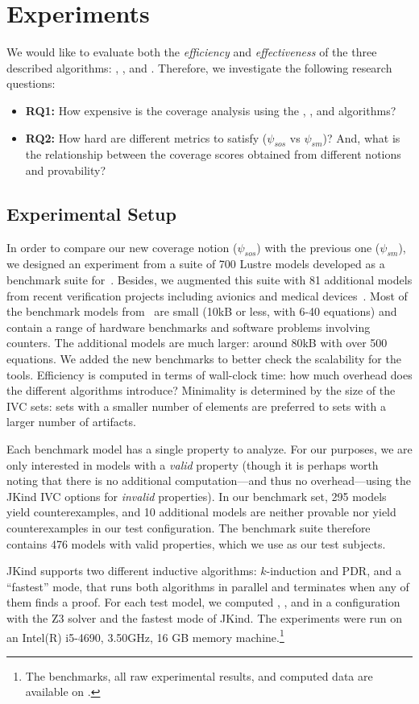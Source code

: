 \section{Experiments}
\label{sec:experiments}

We would like to evaluate both the {\em efficiency} and {\em
  effectiveness} of the three described algorithms: \ucbfalg, \ucalg, and \mustalg. Therefore, we investigate the following research questions:
\begin{itemize}
    \item \textbf{RQ1:} How expensive is the coverage analysis using the \ucalg, \mustalg, and \ucbfalg algorithms?
    \item \textbf{RQ2:} How hard are different metrics to satisfy ($\psi_{sos}$ vs $\psi_{sm}$)?  And, what is the relationship between the coverage scores obtained from different notions and provability?
\end{itemize}

\subsection{Experimental Setup}

In order to compare our new coverage notion ($\psi_{sos}$) with the previous one ($\psi_{sm}$), we designed an experiment from a suite of 700 Lustre models developed
as a benchmark suite for~\cite{Hagen08:FMCAD}. Besides, we augmented this suite
with 81 additional models from recent verification projects including
avionics and medical devices~\cite{QFCS15:backes,hilt2013}. Most of
the benchmark models from~\cite{Hagen08:FMCAD} are small (10kB or less,
with 6-40 equations) and contain a range of hardware benchmarks and
software problems involving counters. The additional models are much
larger: around 80kB with over 500 equations. We added the new
benchmarks to better check the scalability for the tools. Efficiency is computed in terms of wall-clock time: how
much overhead does the different algorithms introduce? Minimality is
determined by the size of the IVC sets: sets with a smaller number of
elements are preferred to sets with a larger number of artifacts.

Each benchmark model has a single property to analyze.  For our purposes, we are only interested in models with a {\em valid} property (though it is perhaps worth noting that there is no additional computation---and thus no overhead---using the JKind IVC options for {\em invalid} properties).  In our benchmark set, 295 models yield counterexamples, and 10 additional models are neither provable nor yield counterexamples in our test configuration.  The benchmark suite therefore contains 476 models with valid properties, which we use as our test subjects.

JKind supports two different inductive algorithms: $k$-induction and PDR, and a ``fastest'' mode, that runs both algorithms in parallel and terminates when any of them finds a proof. For each test model, we computed \ucalg, \ucbfalg, and \mustalg in a configuration with
the Z3 solver and the fastest mode of JKind. The experiments
were run on an  Intel(R) i5-4690, 3.50GHz,
16 GB memory machine.\footnote{The benchmarks, all raw experimental results,
  and computed data are available on \cite{expr}.}

